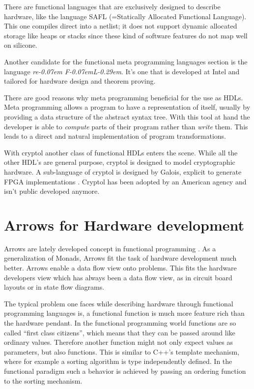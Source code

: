 \documentclass[a4paper,UKenglish]{lipics}
\newcommand{\reFLect}{\textit{re\kern-0.07em F\kern-0.07emL\kern-0.29em\raisebox{0.56ex}{ect}}}
\begin{document}
\par
There are functional languages that are exclusively designed to describe hardware, like the language SAFL (=Statically Allocated
Functional Language)\cite{sharp,sharp:flash,sharp:codesign}. This one compiles direct into a netlist; it does not support dynamic
allocated storage like heaps or stacks since these kind of software features do not map well on silicone.

\par
Another candidate for the functional meta programming languages section is the language \reFLect \cite{reflect}. It's one that is
developed at Intel and tailored for hardware design and theorem proving.

\par
There are good reasons why meta programming beneficial for the use as HDLs. Meta programming allows a program to have a
representation of itself, usually by providing a data structure of the abstract syntax tree. With this tool at hand the developer
is able to \emph{compute} parts of their program rather than \emph{write} them. This leads to a direct and natural implementation
of program transformations.

\par
With cryptol\cite{cryptol:programming} another class of functional HDLs enters the scene. While all the other HDL's are general
purpose, cryptol is designed to model cryptographic hardware. A sub-language of cryptol is designed by Galois, explicit to
generate FPGA implementations \cite{cryptol:fpga}. Cryptol has been adopted by an American agency and isn't public developed
anymore.


\section{Arrows for Hardware development}
Arrows are lately developed concept in functional programming \cite{Hughes98generalisingmonads}. As a generalization of Monads,
Arrows fit the task of hardware development much better. Arrows enable a data flow view onto problems. This fits the hardware
developers view which has always been a data flow view, as in circuit board layouts or in state flow diagrams.

\par
The typical problem one faces while describing hardware through functional programming languages is, a functional function is much
more feature rich than the hardware pendant. In the functional programming world functions are so called ``first class citizens'',
which means that they can be passed around like ordinary values. Therefore another function might not only expect values as
parameters, but also functions. This is similar to C++'s template mechanism, where for example a sorting algorithm is type
independently defined. In the functional paradigm such a behavior is achieved by passing an ordering function to the sorting
mechanism. 
\end{document}
